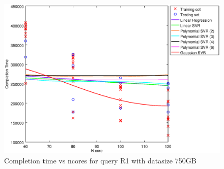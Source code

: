 
\begin {figure}[hbtp]
\centering
\includegraphics[width=\textwidth]{output/R1_750_LINEAR_NCORE/plot_R1_750.eps}
\caption{Completion time vs ncores for query R1 with datasize 750GB}
\label{fig:coreonly_linear_R1_750}
\end {figure}
